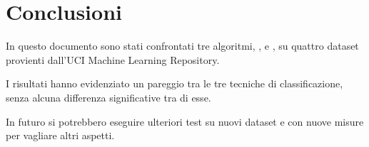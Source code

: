 \chapter{Conclusioni}

In questo documento sono stati confrontati tre algoritmi,  ,  e , su quattro dataset provienti dall'UCI Machine Learning Repository.

I risultati hanno evidenziato un pareggio tra le tre tecniche di classificazione, senza alcuna differenza significative tra di esse.

In futuro si potrebbero eseguire ulteriori test su nuovi dataset e con nuove misure per vagliare altri aspetti.